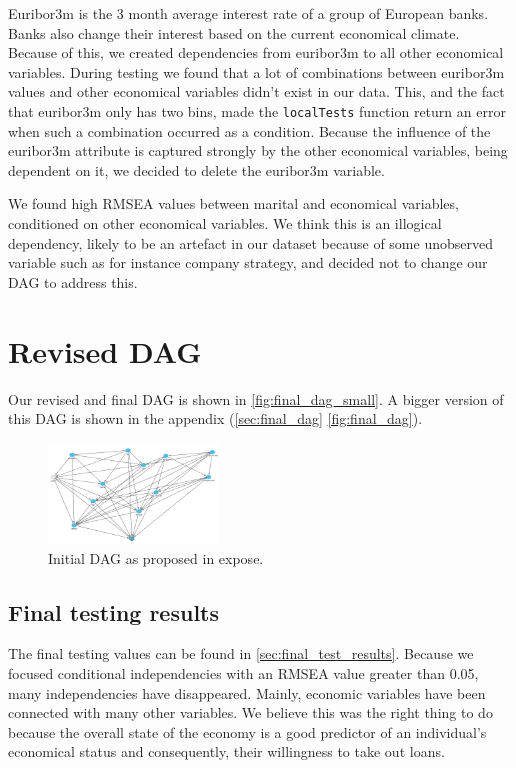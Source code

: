 \documentclass[11pt]{article}
\begin{document}
\begin{multicols}{2}
\bigskip
Euribor3m is the 3 month average interest rate of a group of European banks. Banks also change their
interest based on the current economical climate. Because of this, we created
dependencies from euribor3m to all other economical variables. During testing we
found that a lot of combinations between euribor3m values and other economical
variables didn't exist in our data. This, and the fact that euribor3m only
has two bins, made the \texttt{localTests} function return an error when such a combination occurred as a condition. Because the influence
of the euribor3m attribute is captured strongly by the other economical variables, being
dependent on it, we decided to delete the euribor3m variable.



We found high RMSEA values between marital and economical variables,
conditioned on other economical variables. We think this is an illogical
dependency, likely to be an artefact in our dataset because of some unobserved variable such as for instance company strategy, and decided not to change our DAG to address this.

\section{Revised DAG}
Our revised and final DAG is shown in \autoref{fig:final_dag_small}.  A bigger
version of this DAG is shown in the appendix (\autoref{sec:final_dag}
\autoref{fig:final_dag}). 

\begin{figure}[H]
	\centering
	\includegraphics[width=0.4\textwidth]{images/final_dag}
	\caption{Initial DAG as proposed in expose.}
	\label{fig:final_dag_small}
\end{figure}

\subsection{Final testing results}
The final testing values can be found in \autoref{sec:final_test_results}.
Because we focused conditional independencies with an RMSEA value greater than 0.05, many independencies have disappeared.
Mainly, economic variables have been connected with many other variables.
We believe this was the right thing to do because the overall state of the economy is a good predictor of an individual's economical status and consequently, their willingness to take out loans.


\end{multicols}
\end{document}
